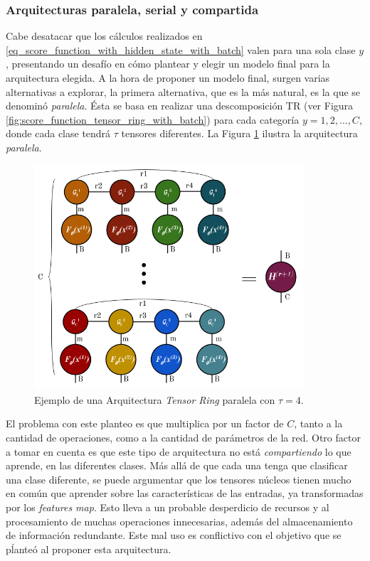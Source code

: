 \documentclass[spanish]{article}
\theoremstyle{definition}
\theoremstyle{remark}
\numberwithin{equation}{section}
\numberwithin{equation}{section} %
\begin{document}
\subsubsection{Arquitecturas paralela, serial y compartida}

Cabe desatacar que los cálculos realizados en \eqref{eq_score_function_with_hidden_state_with_batch} valen para una sola clase $y$, presentando un desafío en cómo plantear y elegir un modelo final para la arquitectura elegida. A la hora de proponer un modelo final, surgen varias alternativas a explorar, la primera alternativa, que es la más natural, es la que se denominó \textit{paralela}. Ésta se basa en realizar una descomposición TR (ver Figura \ref{fig:score_function_tensor_ring_with_batch}) para cada categoría $y=1,2,\dots, C$, donde cada clase tendrá $\tau$ tensores diferentes. La Figura \ref{fig:arquitecture_parallelized} ilustra la arquitectura {\it paralela}.
\begin{figure}[H]
 \centering
 \includegraphics[width=10cm]{img/ejemplo_arquitectura_paralelizada.png}
\caption[Arquitectura \textit{Tensor Ring} paralela]{\footnotesize{Ejemplo de una Arquitectura \textit{Tensor Ring} paralela} con $\tau=4$.}
\label{fig:arquitecture_parallelized}
\end{figure}\par
El problema con este planteo es que multiplica por un factor de $C$, tanto a la cantidad de operaciones, como a la cantidad de parámetros de la red. Otro factor a tomar en cuenta es que este tipo de arquitectura no está \textit{compartiendo} lo que aprende, en las diferentes clases. Más allá de que cada una tenga que clasificar una clase diferente, se puede argumentar que los tensores núcleos tienen mucho en común que aprender sobre las características de las entradas, ya transformadas por los \textit{features map}. Esto lleva a un probable desperdicio de recursos y al procesamiento de muchas operaciones innecesarias, además del almacenamiento de información redundante. Este mal uso es conflictivo con el objetivo que se pĺanteó al proponer esta arquitectura.
\end{document}
